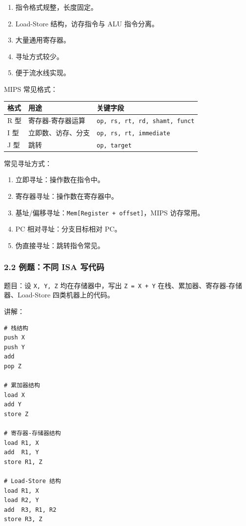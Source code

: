 \documentclass[
]{ctexart}
\newcommand{\passthrough}[1]{#1}
\newcounter{none} %
\providecommand{\tightlist}{%
  \setlength{\itemsep}{0pt}\setlength{\parskip}{0pt}}
\begin{document}
\begin{enumerate}
\def\labelenumi{\arabic{enumi}.}
\tightlist
\item
  指令格式规整，长度固定。
\item
  Load-Store 结构，访存指令与 ALU 指令分离。
\item
  大量通用寄存器。
\item
  寻址方式较少。
\item
  便于流水线实现。
\end{enumerate}

MIPS 常见格式：

{\def\LTcaptype{none} %
\begin{longtable}[]{@{}lll@{}}
\toprule\noalign{}
格式 & 用途 & 关键字段 \\
\midrule\noalign{}
\endhead
\bottomrule\noalign{}
\endlastfoot
R 型 & 寄存器-寄存器运算 &
\passthrough{\lstinline!op, rs, rt, rd, shamt, funct!} \\
I 型 & 立即数、访存、分支 &
\passthrough{\lstinline!op, rs, rt, immediate!} \\
J 型 & 跳转 & \passthrough{\lstinline!op, target!} \\
\end{longtable}
}

常见寻址方式：

\begin{enumerate}
\def\labelenumi{\arabic{enumi}.}
\tightlist
\item
  立即寻址：操作数在指令中。
\item
  寄存器寻址：操作数在寄存器中。
\item
  基址/偏移寻址：\passthrough{\lstinline!Mem[Register + offset]!}，MIPS
  访存常用。
\item
  PC 相对寻址：分支目标相对 PC。
\item
  伪直接寻址：跳转指令常见。
\end{enumerate}

\subsubsection{2.2 例题：不同 ISA
写代码}\label{ux4f8bux9898ux4e0dux540c-isa-ux5199ux4ee3ux7801}

题目：设 \passthrough{\lstinline!X, Y, Z!} 均在存储器中，写出
\passthrough{\lstinline!Z = X + Y!}
在栈、累加器、寄存器-存储器、Load-Store 四类机器上的代码。

讲解：

\begin{lstlisting}
# 栈结构
push X
push Y
add
pop Z

# 累加器结构
load X
add Y
store Z

# 寄存器-存储器结构
load R1, X
add  R1, Y
store R1, Z

# Load-Store 结构
load R1, X
load R2, Y
add  R3, R1, R2
store R3, Z
\end{lstlisting}
\end{document}
